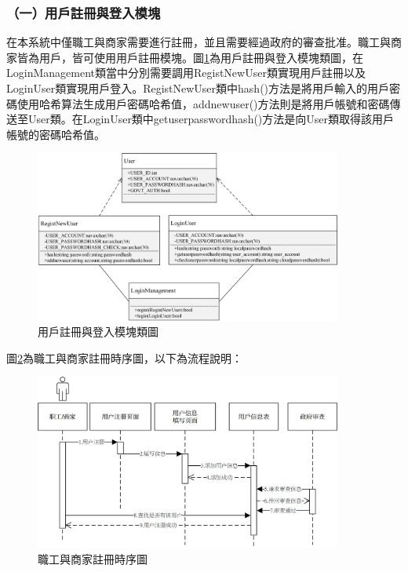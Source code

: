\subsubsection{（一）用戶註冊與登入模塊}
在本系統中僅職工與商家需要進行註冊，並且需要經過政府的審查批准。職工與商家皆為用戶，皆可使用用戶註冊模塊。圖\ref{c3}為用戶註冊與登入模塊類圖，在LoginManagement類當中分別需要調用RegistNewUser類實現用戶註冊以及LoginUser類實現用戶登入。RegistNewUser類中hash()方法是將用戶輸入的用戶密碼使用哈希算法生成用戶密碼哈希值，addnewuser()方法則是將用戶帳號和密碼傳送至User類。在LoginUser類中getuserpasswordhash()方法是向User類取得該用戶帳號的密碼哈希值。

	\begin{figure}[!htbp]
		\centering
		\includegraphics[width = 0.9\textwidth]{c3.jpg}
		\caption{用戶註冊與登入模塊類圖}\label{c3}
	\end{figure}

	圖\ref{time1}為職工與商家註冊時序圖，以下為流程說明：

	\begin{figure}[!htbp]
		\centering
		\includegraphics[width = 0.9\textwidth]{time1.jpg}
		\caption{職工與商家註冊時序圖}\label{time1}
	\end{figure}

